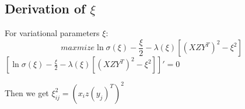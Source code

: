 \documentclass[11pt]{report}
\begin{document}
\subsection{Derivation of $\xi$}
For variational parameters $\xi$:
\begin{equation}
    maxmize \ln{\sigma(\xi)}-\frac{\xi}{2}-\lambda(\xi)[(XZY^{T})^2-\xi^2]
\end{equation}
$[\ln{\sigma(\xi)}-\frac{\xi}{2}-\lambda(\xi)[(XZY^{T})^2-\xi^2]]'=0$

Then we get $\xi_{ij}^{2}=(x_{i}z(y_{j})^T)^2$
\end{document}
